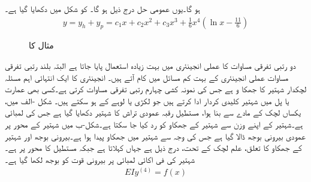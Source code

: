 ہو گا۔یوں عمومی حل درج ذیل ہو گا۔ کو شکل  میں دکھایا گیا ہے۔
\begin{align*}
y=y_h+y_p=c_1x+c_2x^2+c_3x^3+\frac{1}{6}x^4\left(\ln x-\frac{11}{6}\right)
\end{align*}
%
\begin{figure}
\centering
{}
\caption{مثال  کا }
\label{شکل_مثال_سادہ_بلند_یولر_کوشی_بدل}
\end{figure}

دو رتبی تفرقی مساوات کا عملی انجینئری میں بہت زیادہ استعمال پایا جاتا ہے البتہ بلند رتبی تفرقی مساوات عملی انجینئری کے بہت کم مسائل میں کام آتے ہیں۔ انجینئری کا ایک انتہائی اہم مسئلہ لچکدار شہتیر کا جھکا و ہے جس کی نمونہ کشی  چہارم رتبی تفرقی مساوات کرتی ہے۔کسی بھی عمارت یا پل میں شہتیر کلیدی کردار ادا کرتے ہیں جو لکڑی یا لوہے کے ہو سکتے ہیں۔
شکل -الف میں، یکساں لچک کے مادے سے بنا ہوا، مستطیل رقبہ عمودی تراش کا شہتیر دکھایا گیا ہے جس کی لمبائی  ہے۔شہتیر کے اپنے وزن سے شہتیر کے جھکاو کو رد کیا جا سکتا ہے۔شکل-ب میں شہتیر کے  محور پر عمودی بیرونی بوجھ  ڈالا گیا ہے جس کی وجہ سے شہتیر میں جھکاو پیدا ہوا ہے۔بیرونی بوجھ اور شہتیر کے جھکاو کا تعلق، علم لچک کے تحت، درج ذیل ہے  جہاں   کہلاتا ہے جبکہ  مستطیل کا  محور پر  ہے۔شہتیر کی فی اکائی لمبائی پر بیرونی قوت کو بوجھ  لکھا گیا ہے۔ 
\begin{align}\label{مساوات_سادہ_بلند_شہتیر_کا_جھکاو_الف}
EIy^{(4)}=f(x)
\end{align}


